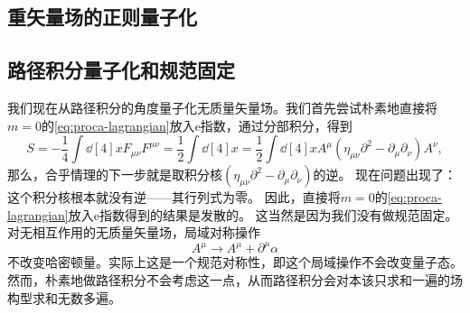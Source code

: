 \documentclass[hyperref, UTF8, a4paper]{ctexart}
\newcommand*{\ee}{\mathrm{e}}
\begin{document}
\subsection{重矢量场的正则量子化}

\subsection{路径积分量子化和规范固定}

我们现在从路径积分的角度量子化无质量矢量场。我们首先尝试朴素地直接将$m=0$的\eqref{eq:proca-lagrangian}放入$\ee$指数，通过分部积分，得到
\begin{equation}
    S = - \frac{1}{4} \int \dd[4]{x} F_{\mu \nu} F^{\mu \nu} = \frac{1}{2} \int \dd[4]{x} = \frac{1}{2} \int \dd[4]{x} A^\mu (\eta_{\mu \nu} \partial^2 - \partial_\mu \partial_\nu) A^\nu,
\end{equation}
那么，合乎情理的下一步就是取积分核$(\eta_{\mu \nu} \partial^2 - \partial_\mu \partial_\nu)$的逆。
现在问题出现了：这个积分核根本就没有逆——其行列式为零。
因此，直接将$m=0$的\eqref{eq:proca-lagrangian}放入$\ee$指数得到的结果是发散的。
这当然是因为我们没有做规范固定。对无相互作用的无质量矢量场，局域对称操作
\[
    A^\mu \longrightarrow A^\mu + \partial^\mu \alpha
\]
不改变哈密顿量。实际上这是一个规范对称性，即这个局域操作不会改变量子态。然而，朴素地做路径积分不会考虑这一点，从而路径积分会对本该只求和一遍的场构型求和无数多遍。
\end{document}
